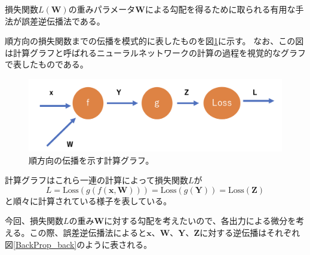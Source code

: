 \begin{enumerate}
損失関数$L(\textbf{W})$の重みパラメータ$\textbf{W}$による勾配を得るために取られる有用な手法が誤差逆伝播法である。

順方向の損失関数までの伝播を模式的に表したものを図\ref{BackProp}に示す。
なお、この図は計算グラフと呼ばれるニューラルネットワークの計算の過程を視覚的なグラフで表したものである。

\begin{figure}[H]
	\begin{center}
		\includegraphics[width=350pt]{./Figure/DeepLearning/BackProp.png}
		\caption[順方向の伝播を示す計算グラフ]{順方向の伝播を示す計算グラフ。}
		\label{BackProp}
	\end{center}
\end{figure}

計算グラフはこれら一連の計算によって損失関数$L$が
\begin{equation}
L = \textrm{Loss}(g( f(\textbf{x}, \textbf{W}))) = \textrm{Loss}(g(\textbf{Y})) = \textrm{Loss}(\textbf{Z})
\end{equation}
と順々に計算されている様子を表している。


今回、損失関数$L$の重み$\textbf{W}$に対する勾配を考えたいので、各出力による微分を考える。この際、誤差逆伝播法によると$\textbf{x}$、$\textbf{W}$、$\textbf{Y}$、$\textbf{Z}$に対する逆伝播はそれぞれ図\ref{BackProp_back}のように表される。


\end{enumerate}
